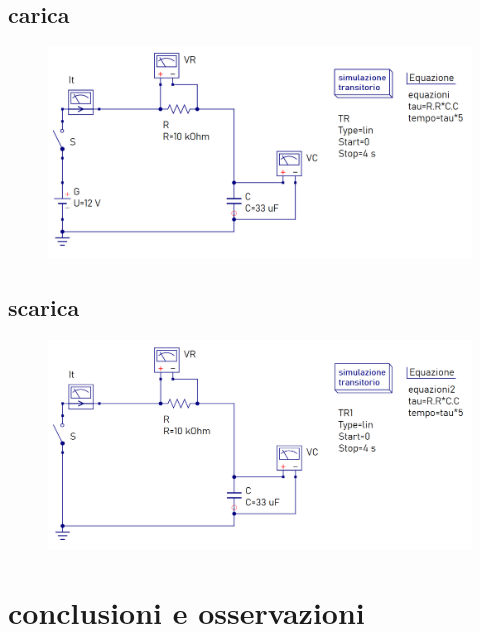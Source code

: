 \documentclass[12pt]{article}
\begin{document}
\subsection*{carica}

\begin{figure}[!h]
  \includegraphics[width=0.9\linewidth]{data/carica-simulazione-qucs.png}
\end{figure}

\subsection*{scarica}

\begin{figure}[!h]
  \includegraphics[width=0.9\linewidth]{data/scarica-simulazione-qucs.png}
\end{figure}

\newpage

\section*{conclusioni e osservazioni}
\end{document}
